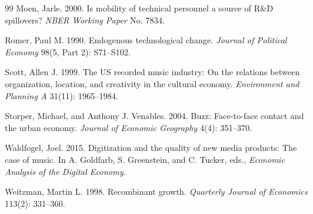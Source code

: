 \begin{thebibliography}{99}
Moen, Jarle. 2000.
\newblock Is mobility of technical personnel a source of R\&D spillovers?
\newblock \emph{NBER Working Paper} No. 7834.

Romer, Paul M. 1990.
\newblock Endogenous technological change.
\newblock \emph{Journal of Political Economy} 98(5, Part 2): S71--S102.

Scott, Allen J. 1999.
\newblock The US recorded music industry: On the relations between organization, location, and creativity in the cultural economy.
\newblock \emph{Environment and Planning A} 31(11): 1965--1984.

Storper, Michael, and Anthony J. Venables. 2004.
\newblock Buzz: Face-to-face contact and the urban economy.
\newblock \emph{Journal of Economic Geography} 4(4): 351--370.

Waldfogel, Joel. 2015.
\newblock Digitization and the quality of new media products: The case of music.
\newblock In A. Goldfarb, S. Greenstein, and C. Tucker, eds., \emph{Economic Analysis of the Digital Economy}.

Weitzman, Martin L. 1998.
\newblock Recombinant growth.
\newblock \emph{Quarterly Journal of Economics} 113(2): 331--360.

\end{thebibliography}
